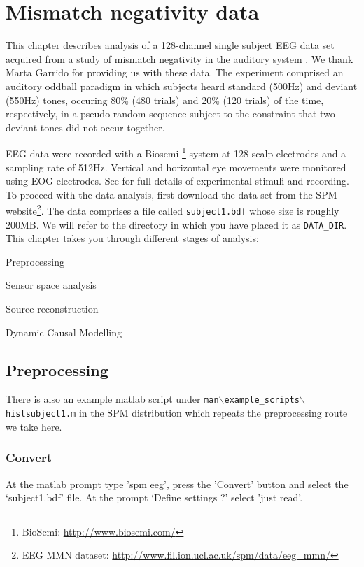 
\chapter{Mismatch negativity data \label{Chap:data:mmn}}

This chapter describes analysis of a 128-channel single subject EEG data set acquired from a study of mismatch negativity in the auditory system \cite{marta_dcm_mmn}. We thank Marta Garrido for providing us with these data. The experiment comprised an auditory oddball paradigm in which subjects heard standard (500Hz) and deviant (550Hz) tones, occuring 80\% (480 trials) and 20\% (120 trials) of the time, respectively, in a pseudo-random sequence subject to the constraint that two deviant tones did not occur together.

EEG data were recorded with a Biosemi \footnote{BioSemi: \url{http://www.biosemi.com/}} system at 128 scalp electrodes and a sampling rate of 512Hz. Vertical and horizontal eye movements were monitored using EOG electrodes. See \cite{marta_dcm_mmn} for full details of experimental stimuli and recording. To proceed with the data analysis, first download the  data set from the SPM website\footnote{EEG MMN dataset: \url{http://www.fil.ion.ucl.ac.uk/spm/data/eeg\_mmn/}}. The data comprises a file called \texttt{subject1.bdf} whose size is roughly 200MB. We will refer to the directory in which you have placed it as \texttt{DATA\_DIR}. This chapter takes you through different stages of analysis:
\bi
\item{Preprocessing}
\item{Sensor space analysis}
\item{Source reconstruction}
\item{Dynamic Causal Modelling}
\ei

\section{Preprocessing}

There is also an example matlab script under \texttt{man$\backslash$example\_scripts$\backslash$histsubject1.m} in the SPM distribution which repeats the preprocessing route we take here.

\subsection{Convert}

At the matlab prompt type 'spm eeg', press the 'Convert' button and select the `subject1.bdf' file. At the prompt `Define settings ?' select 'just read'.

